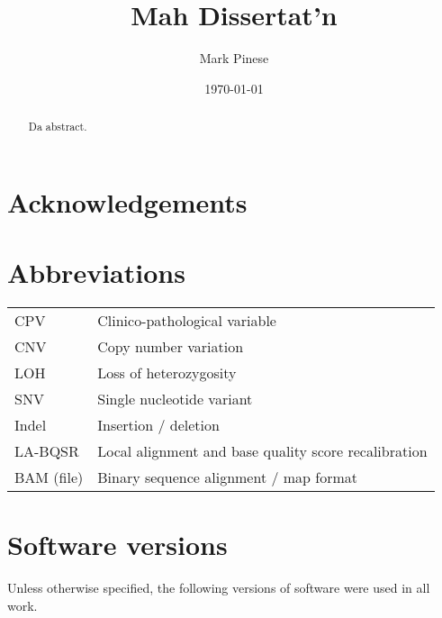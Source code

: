 \documentclass[11pt,a4paper,final,twoside]{memoir}
\begin{document}
\pagestyle{empty}

\title{Mah Dissertat'n}
\author{Mark Pinese}
\date{\today}

\maketitle



\frontmatter

\chapter*{Acknowledgements}
\thispagestyle{empty}
\clearpage

\begin{abstract}
Da abstract.
\end{abstract}
\thispagestyle{empty}
\clearpage

\tableofcontents
\clearpage
\listoffigures
\clearpage
\listoftables

\openany
\chapter*{Abbreviations}

\begin{tabular}[c]{ l | l }
  CPV           & Clinico-pathological variable \\
  CNV           & Copy number variation \\
  LOH           & Loss of heterozygosity \\
  SNV           & Single nucleotide variant \\
  Indel         & Insertion / deletion \\
  LA-BQSR       & Local alignment and base quality score recalibration \\
  BAM (file)    & Binary sequence alignment / map format \\
\end{tabular}


\chapter*{Software versions}
Unless otherwise specified, the following versions of software were used in all work.
\end{document}

